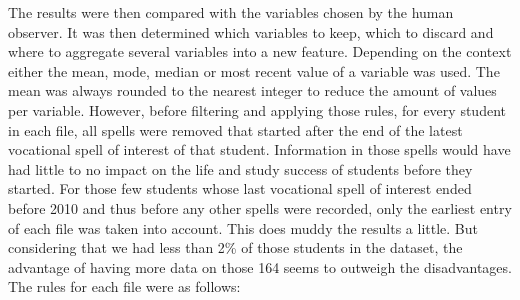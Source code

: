 The results were then compared with the variables chosen by the human observer. It was then determined which variables to keep, which to discard and where to aggregate several variables into a new feature. Depending on the context either the mean, mode, median or most recent value of a variable was used. The mean was always rounded to the nearest integer to reduce the amount of values per variable. However, before filtering and applying those rules, for every student in each file, all spells were removed that started after the end of the latest vocational spell of interest of that student. Information in those spells would have had little to no impact on the life and study success of students before they started. For those few students whose last vocational spell of interest ended before 2010 and thus before any other spells were recorded, only the earliest entry of each file was taken into account. This does muddy the results a little. But considering that we had less than 2\% of those students in the dataset, the advantage of having more data on those 164 seems to outweigh the disadvantages. The rules for each file were as follows:

